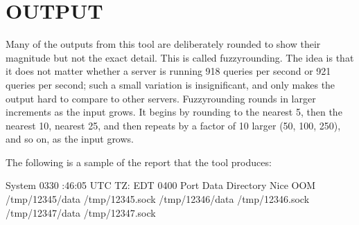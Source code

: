 \documentclass[letterpaper,10pt,english]{sphinxmanual}
\begin{document}
\section{OUTPUT}
\label{\detokenize{mariadb-database-summary:output}}
\sphinxAtStartPar
Many of the outputs from this tool are deliberately rounded to show their
magnitude but not the exact detail.  This is called fuzzy\sphinxhyphen{}rounding. The idea
is that it does not matter whether a server is running 918 queries per second
or 921 queries per second; such a small variation is insignificant, and only
makes the output hard to compare to other servers.  Fuzzy\sphinxhyphen{}rounding rounds in
larger increments as the input grows.  It begins by rounding to the nearest 5,
then the nearest 10, nearest 25, and then repeats by a factor of 10 larger
(50, 100, 250), and so on, as the input grows.

\sphinxAtStartPar
The following is a sample of the report that the tool produces:

\begin{sphinxVerbatim}[commandchars=\\\{\}]
              System   \PYGZhy{}03\PYGZhy{}30 :46:05 UTC
                             TZ: EDT \PYGZhy{}0400
  Port  Data Directory             Nice OOM 
      
   /tmp/12345/data                   /tmp/12345.sock
   /tmp/12346/data                   /tmp/12346.sock
   /tmp/12347/data                   /tmp/12347.sock
\end{sphinxVerbatim}
\end{document}
